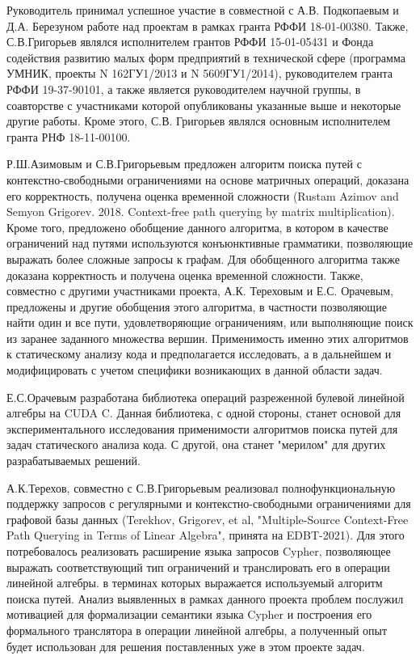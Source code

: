 \documentclass[12pt]{article}  %
\theoremstyle{remark}
\begin{document}
Руководитель принимал успешное участие в совместной с А.В. Подкопаевым и Д.А. Березуном работе над проектам в рамках гранта РФФИ 18-01-00380. Также, С.В.Григорьев являлся исполнителем грантов РФФИ 15-01-05431 и Фонда содействия развитию малых форм предприятий в технической сфере (программа УМНИК, проекты N 162ГУ1/2013 и N 5609ГУ1/2014), руководителем гранта РФФИ 19-37-90101, а также является руководителем научной группы, в соавторстве с участниками которой опубликованы указанные выше и некоторые другие работы. Кроме этого, С.В. Григорьев являлся основным исполнителем гранта РНФ 18-11-00100.  

Р.Ш.Азимовым и С.В.Григорьевым предложен алгоритм поиска путей с контекстно-свободными ограничениями на основе матричных операций, доказана его корректность, получена оценка временной сложности (Rustam Azimov and Semyon Grigorev. 2018. Context-free path querying by matrix multiplication). Кроме того, предложено обобщение данного алгоритма, в котором в качестве ограничений над путями используются конъюнктивные грамматики, позволяющие выражать более сложные запросы к графам. Для обобщенного алгоритма также доказана корректность и получена оценка временной сложности. Также, совместно с другими участниками проекта, А.К. Тереховым и Е.С. Орачевым, предложены и другие обобщения этого алгоритма, в частности позволяющие найти один и все пути, удовлетворяющие ограничениям, или выполняющие поиск из заранее заданного множества вершин. Применимость именно этих алгоритмов к статическому анализу кода и предполагается исследовать, а в дальнейшем и модифицировать с учетом специфики возникающих в данной области задач.

Е.С.Орачевым разработана библиотека операций разреженной булевой линейной алгебры на CUDA C. Данная библиотека, с одной стороны, станет основой для экспериментального исследования применимости алгоритмов поиска путей для задач статического анализа кода. С другой, она станет "мерилом" для других разрабатываемых решений.

А.К.Терехов, совместно с С.В.Григорьевым реализовал полнофункциональную поддержку запросов с регулярными и контекстно-свободными ограничениями для графовой базы данных (Terekhov, Grigorev, et al, "Multiple-Source Context-Free Path Querying in Terms of Linear Algebra", принята на EDBT-2021). Для этого потребовалось реализовать расширение языка запросов Cypher, позволяющее выражать соответствующий тип ограничений и транслировать его в операции линейной алгебры. в терминах которых выражается используемый алгоритм поиска путей. Анализ выявленных в рамках данного проекта проблем послужил мотивацией для формализации семантики языка Cypher и построения его формального транслятора в операции линейной алгебры, а полученный опыт будет использован для решения поставленных уже в этом проекте задач. 
\end{document}
